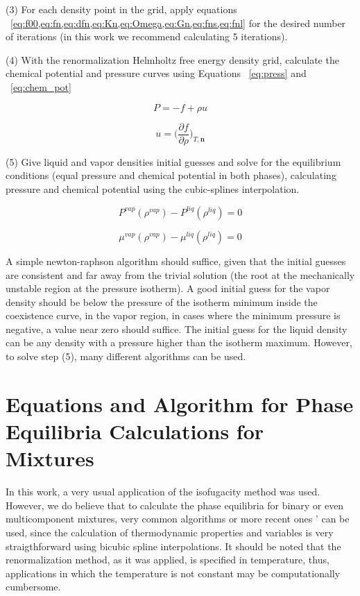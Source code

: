 \documentclass[preprint,12pt,3p]{elsarticle}
\begin{document}
\begin{appendices}
	(3) For each density point in the grid, apply equations ~\cref{eq:f00,eq:fn,eq:dfn,eq:Kn,eq:Omega,eq:Gn,eq:fns,eq:fnl} for the desired number of iterations (in this work we recommend calculating 5 iterations).
	
	(4) With the renormalization Helmholtz free energy density grid, calculate the chemical potential and pressure curves using Equations ~\ref{eq:press} and ~\ref{eq:chem_pot}
	
\begin{equation} \label{eq:press}
    P = -f+\rho u
\end{equation}

\begin{equation} \label{eq:chem_pot}
    u = \Big(\frac{\partial f}{\partial \rho}\Big)_{T,\textbf{n}}
\end{equation}
	
	(5) Give liquid and vapor densities initial guesses and solve for the equilibrium conditions (equal pressure and chemical potential in both phases), calculating pressure and chemical potential using the cubic-splines interpolation.

\begin{equation} \label{eq:equal_press}
	P^{vap}(\rho^{vap}) - P^{liq}(\rho^{liq}) = 0
\end{equation}

\begin{equation} \label{eq:equal_chem_pot}
	\mu^{vap}(\rho^{vap}) - \mu^{liq}(\rho^{liq}) = 0
\end{equation} 

	A simple newton-raphson algorithm should suffice, given that the initial guesses are consistent and far away from the trivial solution (the root at the mechanically unstable region at the pressure isotherm). A good initial guess for the vapor density should be below the pressure of the isotherm minimum inside the coexistence curve, in the vapor region, in cases where the minimum pressure is negative, a value near zero should suffice. The initial guess for the liquid density can be any density with a pressure higher than the isotherm maximum. However, to solve step (5), many different algorithms can be used.
	
\setcounter{equation}{0}
\section{Equations and Algorithm for Phase Equilibria Calculations for Mixtures}

	In this work, a very usual application of the isofugacity method was used. However, we do believe that to calculate the phase equilibria for binary or even multicomponent mixtures, very common algorithms  \cite{michelsen1982isothermal1,michelsen1982isothermal} or more recent ones '  \cite{segtovich2016simultaneous,gupta1991method} can be used, since the calculation of thermodynamic properties and variables is very straigthforward using bicubic spline interpolations. It should be noted that the renormalization method, as it was applied, is specified in temperature, thus, applications in which the temperature is not constant may be computationally cumbersome.
	

\end{appendices}
\end{document}

